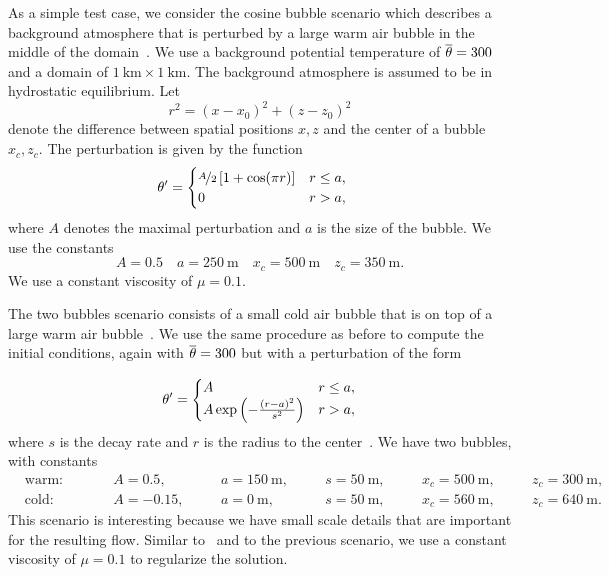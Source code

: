 As a simple test case, we consider the cosine bubble scenario which describes a background atmosphere that is perturbed by a large warm air bubble in the middle of the domain~\cite{giraldo2008study}.
We use a background potential temperature of $\overline{\theta} = 300$ and a domain of $\SI{1}{\km} \times \SI{1}{\km}$.
The background atmosphere is assumed to be in hydrostatic equilibrium.
Let
\begin{equation}
  \label{eq:radius}
  r^2 = (x - x_0)^2 + (z - z_0)^2
\end{equation}
denote the difference between spatial positions $x,z$ and the center of a bubble $x_c, z_c$.
The perturbation is given by the function
\begin{align}
  \label{eq:cos-pertubation}
  \theta' &= \begin{cases}
    \nicefrac{A}{2} \left[ 1 + \cos(\pi r) \right] & r \leq a, \\
    0 & r > a,
    \end{cases}
\end{align}
where $A$ denotes the maximal perturbation and $a$ is the size of the bubble.
We use the constants
\begin{equation}\label{eq:cosine-bubble}
  A = 0.5 \quad a = \SI{250}{\m} \quad x_c = \SI{500}{\m} \quad z_c = \SI{350}{\m}.
\end{equation}
We use a constant viscosity of $\mu = 0.1$.

The two bubbles scenario consists of a small cold air bubble that is on top of a large warm air bubble~\cite{robert1993bubble,muller2010adaptive}.
We use the same procedure as before to compute the initial conditions, again with $\overline{\theta} = 300$ but with a perturbation of the form

\begin{equation}
  \label{eq:bubbles-pertubation}
  \theta' =
  \begin{cases}
    A & r \leq a, \\
    A \exp \left( - \frac{(r-a)^2}{s^2} \right) & r > a,
    \end{cases}
\end{equation}
where $s$ is the decay rate and $r$  is the radius to the center~.
We have two bubbles, with constants
\begin{equation}
  \label{eq:bubbles-values}
\begin{alignedat}{6}
  & \text{warm:} \qquad && A = 0.5, \quad&& a = \SI{150}{\m}, \quad&& s = \SI{50}{\m}, \quad&& x_c = \SI{500}{\m,} \quad&& z_c = \SI{300}{\m},\\
  & \text{cold:} \qquad && A = -0.15, \quad&& a = \SI{0}{\m}, \quad&& s = \SI{50}{\m}, \quad&& x_c = \SI{560}{\m}, \quad&& z_c = \SI{640}{\m}.
  \end{alignedat}
\end{equation}
This scenario is interesting because we have small scale details that are important for the resulting flow.
Similar to~\cite{muller2010adaptive} and to the previous scenario, we use a constant viscosity of $\mu = 0.1$ to regularize the solution.

